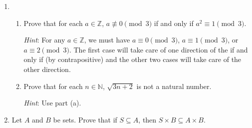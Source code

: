 \documentclass[12pt]{article}
\newcommand{\points}[1]{\marginpar{\hspace{24pt}[#1]}}
\newcommand{\Z}{\mathbb{Z}}
\newcommand{\N}{\mathbb{N}}
\newcommand{\modd}[3]{#1\equiv #2 \pmod{#3}}
\begin{document}
\thispagestyle{fancy}

 \begin{enumerate}
 \item \begin{enumerate}
 \item Prove that for each $a\in\Z$, $a\not\equiv 0\pmod{3}$ if and only if $\modd{a^2}{1}{3}$.\points{4}

{\em Hint}: For any $a\in \Z$, we must have $\modd{a}{0}{3}$, $\modd{a}{1}{3}$, or $\modd{a}{2}{3}$. The first case will take care of one direction of the if and only if (by contrapositive) and the other two cases will take care of the other direction.

\vspace{5in}

 \item Prove that for each $n\in\N$, $\sqrt{3n+2}$ is not a natural number. \points{2}

{\em Hint}: Use part (a).
\end{enumerate}
\newpage

\item Let $A$ and $B$ be sets. Prove that if $S\subseteq A$, then $S\times B\subseteq A\times B$.\points{4}
 \end{enumerate}
\end{document}
